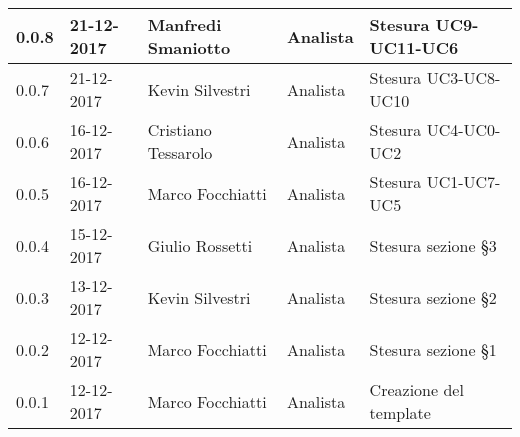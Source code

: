 \documentclass[./AnalisideiRequisiti.tex]{subfiles}
\begin{document}
{\begin{longtable}{|p{20mm}|p{20mm}|p{40mm}|p{30mm}|p{50mm}|}
		0.0.8 & 21-12-2017 & Manfredi Smaniotto & Analista & Stesura UC9-UC11-UC6\\ \hline
		0.0.7 & 21-12-2017 & Kevin Silvestri & Analista & Stesura UC3-UC8-UC10\\ \hline
		0.0.6 & 16-12-2017 & Cristiano Tessarolo & Analista & Stesura UC4-UC0-UC2\\ \hline
		0.0.5 & 16-12-2017 & Marco Focchiatti & Analista & Stesura UC1-UC7-UC5\\ \hline
		0.0.4 & 15-12-2017 & Giulio Rossetti & Analista & Stesura sezione §3\\ \hline
		0.0.3 & 13-12-2017 & Kevin Silvestri & Analista & Stesura sezione §2\\ \hline
		0.0.2 & 12-12-2017 & Marco Focchiatti & Analista & Stesura sezione §1\\ \hline
		0.0.1 & 12-12-2017 & Marco Focchiatti & Analista & Creazione del template\\ \hline
	\end{longtable}

}	
\end{document}
